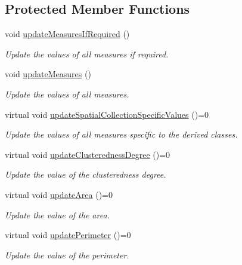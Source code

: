 \subsection*{Protected Member Functions}
\begin{DoxyCompactItemize}
\item 
void \hyperlink{classmultiscale_1_1analysis_1_1SpatialCollection2D_a731de1009ba24b4fda5003c9cec5196c}{update\-Measures\-If\-Required} ()
\begin{DoxyCompactList}\small\item\em Update the values of all measures if required. \end{DoxyCompactList}\item 
void \hyperlink{classmultiscale_1_1analysis_1_1SpatialCollection2D_a8e5a2af581895142da9b50eeeabeb7be}{update\-Measures} ()
\begin{DoxyCompactList}\small\item\em Update the values of all measures. \end{DoxyCompactList}\item 
virtual void \hyperlink{classmultiscale_1_1analysis_1_1SpatialCollection2D_ad94bce09032b184ebfd5b5006217c683}{update\-Spatial\-Collection\-Specific\-Values} ()=0
\begin{DoxyCompactList}\small\item\em Update the values of all measures specific to the derived classes. \end{DoxyCompactList}\item 
virtual void \hyperlink{classmultiscale_1_1analysis_1_1SpatialCollection2D_a7deb494a09ce1f44b1b7e8ac5255cd0b}{update\-Clusteredness\-Degree} ()=0
\begin{DoxyCompactList}\small\item\em Update the value of the clusteredness degree. \end{DoxyCompactList}\item 
virtual void \hyperlink{classmultiscale_1_1analysis_1_1SpatialCollection2D_a160aae10901ef5198db1b03bdef68065}{update\-Area} ()=0
\begin{DoxyCompactList}\small\item\em Update the value of the area. \end{DoxyCompactList}\item 
virtual void \hyperlink{classmultiscale_1_1analysis_1_1SpatialCollection2D_a6751a928c631fe725a2e7c5226e3720b}{update\-Perimeter} ()=0
\begin{DoxyCompactList}\small\item\em Update the value of the perimeter. \end{DoxyCompactList}\item 

\end{DoxyCompactItemize}
